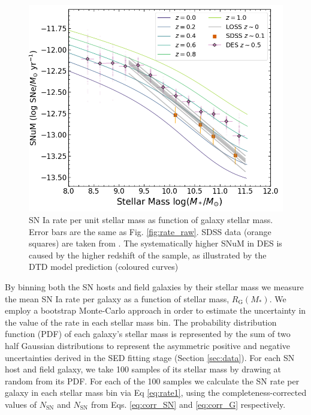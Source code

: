 \documentclass[fleqn,usenatbib]{mnras}
\providecommand{\DIFadd}[1]{{\protect\color{blue}\uwave{#1}}} %
\providecommand{\DIFdel}[1]{{\protect\color{red}\sout{#1}}}                      %
\providecommand{\DIFaddbegin}{} %
\providecommand{\DIFaddend}{} %
\providecommand{\DIFdelbegin}{} %
\providecommand{\DIFdelend}{} %
\newcommand{\DIFscaledelfig}{0.5}
\newlength{\DIFdelgraphicswidth} %
\newlength{\DIFdelgraphicsheight} %
\newcommand{\DIFaddincludegraphics}[2][]{{\color{blue}\fbox{\DIFOincludegraphics[#1]{#2}}}} %
\newcommand{\DIFdelincludegraphics}[2][]{%
\sbox{\DIFdelgraphicsbox}{\DIFOincludegraphics[#1]{#2}}%
\settoboxwidth{\DIFdelgraphicswidth}{\DIFdelgraphicsbox} %
\settoboxtotalheight{\DIFdelgraphicsheight}{\DIFdelgraphicsbox} %
\scalebox{\DIFscaledelfig}{%
\parbox[b]{\DIFdelgraphicswidth}{\usebox{\DIFdelgraphicsbox}\\[-\baselineskip] \rule{\DIFdelgraphicswidth}{0em}}\llap{\resizebox{\DIFdelgraphicswidth}{\DIFdelgraphicsheight}{%
\setlength{\unitlength}{\DIFdelgraphicswidth}%
\begin{picture}(1,1)%
\thicklines\linethickness{2pt} %
{\color[rgb]{1,0,0}\put(0,0){\framebox(1,1){}}}%
{\color[rgb]{1,0,0}\put(0,0){\line( 1,1){1}}}%
{\color[rgb]{1,0,0}\put(0,1){\line(1,-1){1}}}%
\end{picture}%
}\hspace*{3pt}}} %
} %
\DeclareRobustCommand{\DIFaddbegin}{\DIFOaddbegin \let\includegraphics\DIFaddincludegraphics} %
\DeclareRobustCommand{\DIFaddend}{\DIFOaddend \let\includegraphics\DIFOincludegraphics} %
\DeclareRobustCommand{\DIFdelbegin}{\DIFOdelbegin \let\includegraphics\DIFdelincludegraphics} %
\DeclareRobustCommand{\DIFdelend}{\DIFOaddend \let\includegraphics\DIFOincludegraphics} %
\begin{document}
\begin{figure}
    \centering
    \includegraphics[width=.5\textwidth]{figs/SNuM.png}
    \caption{SN Ia rate per unit stellar mass as function of galaxy stellar mass. Error bars are the same as Fig. \ref{fig:rate_raw}. SDSS data (orange squares) are taken from \citet{Graur2013}. The systematically higher SNuM in DES is caused by the higher redshift of the sample, as illustrated by the DTD model prediction (coloured curves) }%
    \label{fig:snum}
\end{figure}
By binning both the SN hosts and field galaxies by their stellar mass we measure the mean SN Ia rate per galaxy as a function of stellar mass, $R_{\mathrm{G}}(M_*)$. We employ a bootstrap Monte-Carlo approach in order to estimate the uncertainty in the value of the rate in each stellar mass bin. The probability distribution function (PDF) of each galaxy's stellar mass is represented by the sum of two half Gaussian distributions to represent the asymmetric positive and negative uncertainties derived in the SED fitting stage (Section \ref{sec:data}). For each SN host and field galaxy, we take 100 samples of its stellar mass by drawing at random from its PDF. For each of the 100 samples we calculate the SN rate per galaxy in each stellar mass bin via Eq \ref{eq:rate1}, using the completeness-corrected values of $N_{\mathrm{SN}}$ and \DIFdelbegin \DIFdel{$N_{\mathrm{SN}}$ }\DIFdelend \DIFaddbegin \DIFadd{$N_{\mathrm{G}}$ }\DIFaddend from Eqs. \ref{eq:corr_SN} and \ref{eq:corr_G} respectively. 
\end{document}
